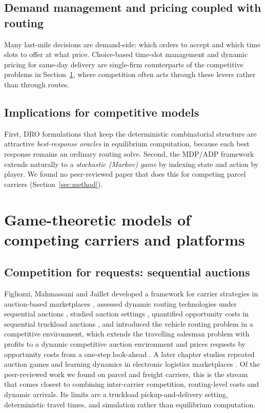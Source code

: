 \documentclass[preprint,12pt]{elsarticle}
\begin{document}
\subsection{Demand management and pricing coupled with routing}

Many last-mile decisions are demand-side: which orders to accept and which time slots to offer at what price. Choice-based time-slot management \cite{Agatz2011,Yang2016} and dynamic pricing for same-day delivery \cite{Ulmer2020pricing} are single-firm counterparts of the competitive problems in Section~\ref{sec:games}, where competition often acts through these levers rather than through routes.

\subsection{Implications for competitive models}

First, DRO formulations that keep the deterministic combinatorial structure \cite{GhosalWiesemann2020,GhosalHoWiesemann2024} are attractive \emph{best-response oracles} in equilibrium computation, because each best response remains an ordinary routing solve. Second, the MDP/ADP framework extends naturally to a \emph{stochastic (Markov) game} by indexing state and action by player. We found no peer-reviewed paper that does this for competing parcel carriers (Section~\ref{sec:method}).

\section{Game-theoretic models of competing carriers and platforms}\label{sec:games}

\subsection{Competition for requests: sequential auctions}

Figliozzi, Mahmassani and Jaillet developed a framework for carrier strategies in auction-based marketplaces \cite{Figliozzi2003}, assessed dynamic routing technologies under sequential auctions \cite{Figliozzi2004}, studied auction settings \cite{Figliozzi2005}, quantified opportunity costs in sequential truckload auctions \cite{Figliozzi2006}, and introduced the vehicle routing problem in a competitive environment, which extends the travelling salesman problem with profits to a dynamic competitive auction environment and prices requests by opportunity costs from a one-step look-ahead \cite{Figliozzi2007}. A later chapter studies repeated auction games and learning dynamics in electronic logistics marketplaces \cite{Figliozzi2008}. Of the peer-reviewed work we found on parcel and freight carriers, this is the stream that comes closest to combining inter-carrier competition, routing-level costs and dynamic arrivals. Its limits are a truckload pickup-and-delivery setting, deterministic travel times, and simulation rather than equilibrium computation.
\end{document}
